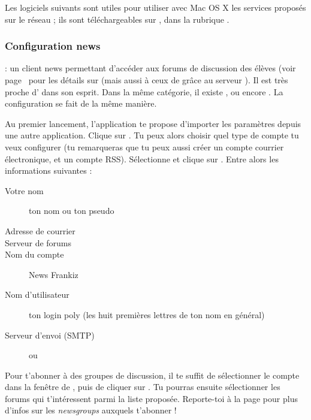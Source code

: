 

Les logiciels suivants sont utiles pour utiliser avec Mac OS X les services proposés sur le réseau ; ils sont téléchargeables sur , dans la rubrique .

\pagebreak

\subsubsection{Configuration news}

 : un client news permettant d'accéder aux forums de discussion des élèves (voir page~\pageref{newsgroups} pour les détails sur  (mais aussi à ceux de  grâce au serveur ). Il est très proche d' dans son esprit. Dans la même catégorie, il existe ,  ou encore . La configuration se fait de la même manière.

Au premier lancement, l'application te propose d'importer les paramètres depuis une autre application. Clique sur . Tu peux alors choisir quel type de compte tu veux configurer (tu remarqueras que tu peux aussi créer un compte courrier électronique, et un compte RSS). Sélectionne  et clique sur . Entre alors les informations suivantes :

\begin{description}
  \item[Votre nom] ton nom ou ton pseudo
  \item[Adresse de courrier] 
  \item[Serveur de forums] 
  \item[Nom du compte] News Frankiz
  \item[Nom d'utilisateur] ton login poly (les huit premières lettres de ton nom en général)
  \item[Serveur d'envoi (SMTP)]  ou 
\end{description}


Pour t'abonner à des groupes de discussion, il te suffit de sélectionner le compte  dans la fenêtre  de , puis de cliquer sur . Tu pourras ensuite sélectionner les forums qui t'intéressent parmi la liste proposée. Reporte-toi à la page \pageref{newsgroups} pour plus d'infos sur les \emph{newsgroups} auxquels t'abonner !


